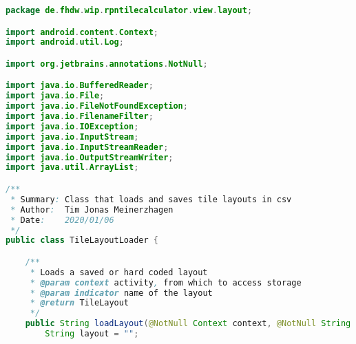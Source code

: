 \begin{lstlisting}[caption=TileLayoutLoader,label=list:TileLayoutLoader,language=Java]
package de.fhdw.wip.rpntilecalculator.view.layout;

import android.content.Context;
import android.util.Log;

import org.jetbrains.annotations.NotNull;

import java.io.BufferedReader;
import java.io.File;
import java.io.FileNotFoundException;
import java.io.FilenameFilter;
import java.io.IOException;
import java.io.InputStream;
import java.io.InputStreamReader;
import java.io.OutputStreamWriter;
import java.util.ArrayList;

/**
 * Summary: Class that loads and saves tile layouts in csv
 * Author:  Tim Jonas Meinerzhagen
 * Date:    2020/01/06
 */
public class TileLayoutLoader {

    /**
     * Loads a saved or hard coded layout
     * @param context activity, from which to access storage
     * @param indicator name of the layout
     * @return TileLayout
     */
    public String loadLayout(@NotNull Context context, @NotNull String indicator) {
        String layout = "";


\end{lstlisting}

